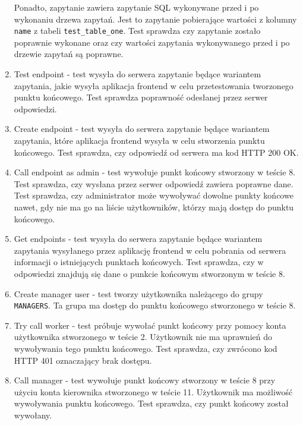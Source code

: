 \begin{enumerate}
        Ponadto, zapytanie zawiera zapytanie SQL wykonywane przed i po wykonaniu
        drzewa zapytań. Jest to zapytanie pobierające wartości z kolumny
        \verb|name| z tabeli \verb|test_table_one|. Test sprawdza czy zapytanie
        zostało poprawnie wykonane oraz czy wartości zapytania wykonywanego
        przed i po drzewie zapytań są poprawne.

    \item Test endpoint - test wysyła do serwera zapytanie będące wariantem
        zapytania, jakie wysyła aplikacja frontend w celu przetestowania
        tworzonego punktu końcowego. Test sprawdza poprawność odesłanej przez
        serwer odpowiedzi.

    \item Create endpoint - test wysyła do serwera zapytanie będące wariantem
        zapytania, które aplikacja frontend wysyła w celu stworzenia punktu
        końcowego. Test sprawdza, czy odpowiedź od serwera ma kod HTTP 200 OK.

    \item Call endpoint as admin - test wywołuje punkt końcowy stworzony w
        teście 8. Test sprawdza, czy wysłana przez serwer odpowiedź zawiera
        poprawne dane. Test sprawdza, czy administrator może wywoływać dowolne
        punkty końcowe nawet, gdy nie ma go na liście użytkowników, którzy mają
        dostęp do punktu końcowego.

    \item Get endpoints - test wysyła do serwera zapytanie będące wariantem
        zapytania wysyłanego przez aplikację frontend w celu pobrania od serwera
        informacji o istniejących punktach końcowych. Test sprawdza, czy w
        odpowiedzi znajdują się dane o punkcie końcowym stworzonym w teście 8.

    \item Create manager user - test tworzy użytkownika należącego do grupy
        \verb|MANAGERS|. Ta grupa ma dostęp do punktu końcowego stworzonego w
        teście 8.

    \item Try call worker - test próbuje wywołać punkt końcowy przy pomocy konta
        użytkownika stworzonego w teście 2. Użytkownik nie ma uprawnień do
        wywoływania tego punktu końcowego. Test sprawdza, czy zwrócono kod HTTP
        401 oznaczający brak dostępu.

    \item Call manager - test wywołuje punkt końcowy stworzony w teście 8 przy
        użyciu konta kierownika stworzonego w teście 11. Użytkownik ma możliwość
        wywoływania punktu końcowego. Test sprawdza, czy punkt końcowy został
        wywołany.

\end{enumerate}

